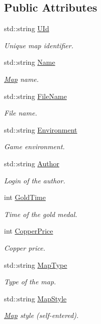 \subsection*{Public Attributes}
\begin{DoxyCompactItemize}
\item 
std\-::string \hyperlink{structMap_aeeaed7abcf77e119d5f59c0918183834}{U\-Id}
\begin{DoxyCompactList}\small\item\em Unique map identifier. \end{DoxyCompactList}\item 
std\-::string \hyperlink{structMap_ab1a5bf049a4b74e704128d31e9b53b8c}{Name}
\begin{DoxyCompactList}\small\item\em \hyperlink{structMap}{Map} name. \end{DoxyCompactList}\item 
std\-::string \hyperlink{structMap_a0ec301bf4f1d129cd9bc50999581eec9}{File\-Name}
\begin{DoxyCompactList}\small\item\em File name. \end{DoxyCompactList}\item 
std\-::string \hyperlink{structMap_acbaadf8f635b04a1229fa01f6ec4c4dc}{Environment}
\begin{DoxyCompactList}\small\item\em Game environment. \end{DoxyCompactList}\item 
std\-::string \hyperlink{structMap_a1eb246326a4ec70df2dc71887efca5c9}{Author}
\begin{DoxyCompactList}\small\item\em Login of the author. \end{DoxyCompactList}\item 
int \hyperlink{structMap_a769a574be92aa024f7804627c167ceff}{Gold\-Time}
\begin{DoxyCompactList}\small\item\em Time of the gold medal. \end{DoxyCompactList}\item 
int \hyperlink{structMap_aa9a7d229fb6b41092fb527bbcc913faf}{Copper\-Price}
\begin{DoxyCompactList}\small\item\em Copper price. \end{DoxyCompactList}\item 
std\-::string \hyperlink{structMap_a23d051ee3c7cfa606082e700099563b0}{Map\-Type}
\begin{DoxyCompactList}\small\item\em Type of the map. \end{DoxyCompactList}\item 
std\-::string \hyperlink{structMap_a5fe4c64985a8d769e21fe32bab7a879c}{Map\-Style}
\begin{DoxyCompactList}\small\item\em \hyperlink{structMap}{Map} style (self-\/entered). \end{DoxyCompactList}\end{DoxyCompactItemize}


